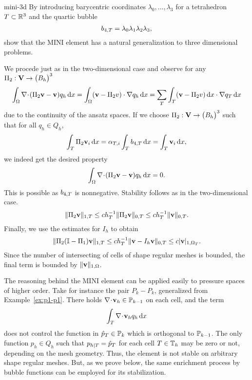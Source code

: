 \begin{Problem}{mini-3d}
  By introducing barycentric coordinates $\lambda_0,\dots,\lambda_3$
  for a tetrahedron $\cell\subset\R^3$ and the quartic bubble
  \begin{gather}
    b_{4,\cell} = \lambda_0\lambda_1\lambda_2\lambda_3,
  \end{gather}
  show that the MINI element has a natural generalization to three
  dimensional problems.
\begin{solution}
  We procede just as in the two-dimensional case and observe for any
  $\Pi_2: \vV \to \bigl(B_h\bigr)^3$
  \begin{align}
    \int_\domain \div(\Pi_2 \vv-\vv) q_h \dx
    = \int_\domain (\vv-\Pi_2v)\cdot\nabla q_h\dx = \sum_\cell\int_\cell (\vv-\Pi_2v)\dx\cdot\nabla q_\cell\dx
  \end{align}
  due to the continuity of the ansatz spaces.
  If we choose $\Pi_2: \vV \to \bigl(B_h\bigr)^3$ such that for all $q_h\in Q_h$,
  \begin{align}
   \int_\cell \Pi_2 \vv_i \dx
    = \alpha_{\cell,i} \int_\cell b_{4,\cell}\dx
    = \int_\cell \vv_i\dx,
  \end{align}
  we indeed get the desired property
  \begin{align}
    \int_\domain \div(\Pi_2 \vv-\vv) q_h \dx = 0.
  \end{align}
  This is possible as $b_{4,\cell}$ is nonnegative. Stability follows as in the two-dimensional case.
  \begin{gather}
    \norm{\Pi_2 \vv}_{1,\cell}
    \le c h_\cell^{-1} \norm{\Pi_2 \vv}_{0,\cell}
    \le c h_\cell^{-1} \norm{\vv}_{0,\cell}.
  \end{gather}
  Finally, we use the estimates for $I_h$ to obtain
  \begin{gather}
    \norm{\Pi_2 (\identity-\Pi_1) \vv}_{1,\cell}
    \le c h_\cell^{-1} \norm{\vv-I_h \vv}_{0,\cell}
    \le c \snorm{\vv}_{1,\domain_\cell}.
  \end{gather}
  Since the number of intersecting of cells of shape regular meshes is
  bounded, the final term is bounded by $\norm \vv_{1,\domain}$.
\end{solution}

\end{Problem}

\begin{intro}
  The reasoning behind the MINI element can be applied easily to
  pressure spaces of higher order. Take for instance the pair
  $P_k-P_k$, generalized from Example~\ref{ex:p1-p1}.
  There holds $\div \vv_h \in \P_{k-1}$ on each cell,
  and the term
  \begin{gather}
    \int_\cell \div \vv_h q_h\dx
  \end{gather}
  does not control the function in $\hat p_\cell \in \P_k$ which is
  orthogonal to $\P_{k-1}$. The only function $p_h\in Q_h$ such that
  $p_{h|\cell} = \hat p_\cell$ for each cell $\cell\in\mesh_h$ may be
  zero or not, depending on the mesh geometry. Thus, the element is
  not stable on arbitrary shape regular meshes. But, as we prove
  below, the same enrichment process by bubble functions can be
  employed for its stabilization.
\end{intro}

